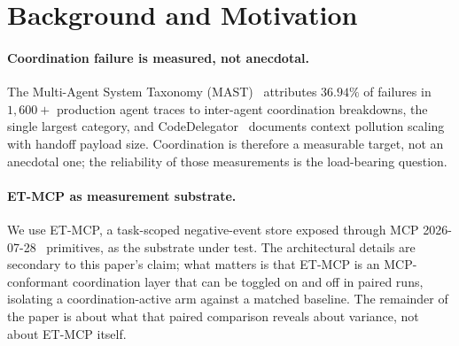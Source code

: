 \section{Background and Motivation}
\label{sec:background}

\paragraph{Coordination failure is measured, not anecdotal.}
The Multi-Agent System Taxonomy (MAST)~\cite{mast2025}
attributes $36.94\%$ of failures in $1{,}600+$ production agent
traces to inter-agent coordination breakdowns, the single
largest category, and CodeDelegator~\cite{codedelegator2026}
documents context pollution scaling with handoff payload size.
Coordination is therefore a measurable target, not an
anecdotal one; the reliability of those measurements is
the load-bearing question.

\paragraph{ET-MCP as measurement substrate.}
We use ET-MCP, a task-scoped negative-event store exposed
through MCP 2026-07-28~\cite{mcpspec2026} primitives, as the
substrate under test. The architectural details are secondary
to this paper's claim; what matters is that ET-MCP is an
MCP-conformant coordination layer that can be toggled on and
off in paired runs, isolating a coordination-active arm against
a matched baseline. The remainder of the paper is about what
that paired comparison reveals about variance, not about ET-MCP
itself.
